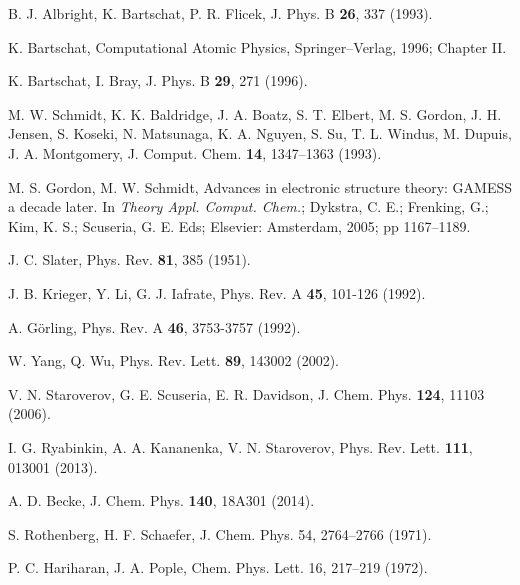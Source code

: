 \begin{thebibliography}{9}
\begin{comment}
\bibitem{Filippi:94} 
C. Filippi, C. J. Umrigar, M. Taut, 
J. Chem. Phys. \textbf{100}, 1290 (1994).

\end{comment}

B. J. Albright, K. Bartschat, P. R. Flicek,
J. Phys. B \textbf{26}, 337 (1993).

K. Bartschat, 
Computational Atomic Physics,
Springer--Verlag, 1996; Chapter II.

K. Bartschat, I. Bray, 
J. Phys. B \textbf{29}, 271 (1996).


M. W. Schmidt, K. K. Baldridge, J. A. Boatz, S. T. Elbert, M. S. Gordon, 
J. H. Jensen, S. Koseki, N. Matsunaga, K. A. Nguyen, S. Su, T. L. Windus, 
M. Dupuis, J. A. Montgomery, 
J. Comput. Chem. \textbf{14}, 1347--1363 (1993).

M. S. Gordon, M. W. Schmidt, 
Advances in electronic structure theory: GAMESS a decade later. 
In \textit{Theory Appl. Comput. Chem.}; 
Dykstra, C. E.; Frenking, G.; Kim, K. S.; Scuseria, G. E. Eds;
Elsevier: Amsterdam, 2005; pp 1167--1189.


J. C. Slater, 
Phys. Rev. \textbf{81}, 385 (1951).

J. B. Krieger, Y. Li, G. J. Iafrate, 
Phys. Rev. A \textbf{45}, 101-126 (1992).

A. G\"orling,
Phys. Rev. A \textbf{46}, 3753-3757 (1992).

W. Yang, Q. Wu,
Phys. Rev. Lett. \textbf{89}, 143002 (2002).

V. N. Staroverov, G. E. Scuseria, E. R. Davidson,
J. Chem. Phys. \textbf{124}, 11103 (2006).

I. G. Ryabinkin, A. A. Kananenka, V. N. Staroverov,
Phys. Rev. Lett. \textbf{111}, 013001 (2013).

A. D. Becke,
J. Chem. Phys. \textbf{140}, 18A301 (2014).


S. Rothenberg, H. F. Schaefer, 
J. Chem. Phys. 54, 2764--2766 (1971).

P. C. Hariharan, J. A. Pople, 
Chem. Phys. Lett. 16, 217--219 (1972).


\end{thebibliography}
